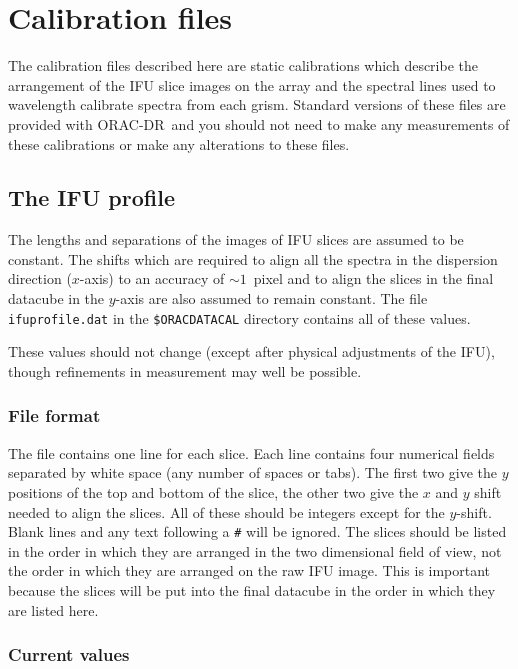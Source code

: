 \documentclass[twoside,11pt]{article}
\renewcommand{\_}{\texttt{\symbol{95}}}
\newcommand{\ORACDR}{{\footnotesize ORAC-DR}}
\begin{document}
\section{Calibration files}

The calibration files described here are static calibrations which
describe the arrangement of the IFU slice images on the array and the
spectral lines used to wavelength calibrate spectra from each
grism. Standard versions of these files are provided with \ORACDR\ and
you should not need to make any measurements of these calibrations or
make any alterations to these files.

\subsection{The IFU profile}

The lengths and separations of the images of IFU slices are assumed to
be constant. The shifts which are required to align all the spectra in
the dispersion direction ($x$-axis) to an accuracy of $\sim 1$~pixel
and to align the slices in the final datacube in the $y$-axis are also
assumed to remain constant. The file {\tt ifu\_profile.dat} in the
{\tt \$ORAC\_DATA\_CAL} directory contains all of these values.

These values should not change (except after physical adjustments of
the IFU), though refinements in measurement may well be possible.

\subsubsection{File format}

The file contains one line for each slice. Each line contains four
numerical fields separated by white space (any number of spaces or
tabs). The first two give the $y$ positions of the top and bottom of
the slice, the other two give the $x$ and $y$ shift needed to align
the slices. All of these should be integers except for the
$y$-shift. Blank lines and any text following a {\tt \#} will be
ignored. The slices should be listed in the order in which they are
arranged in the two dimensional field of view, not the order in which
they are arranged on the raw IFU image. This is important because the
slices will be put into the final datacube in the order in which they
are listed here.


\subsubsection{Current values}
\end{document}
